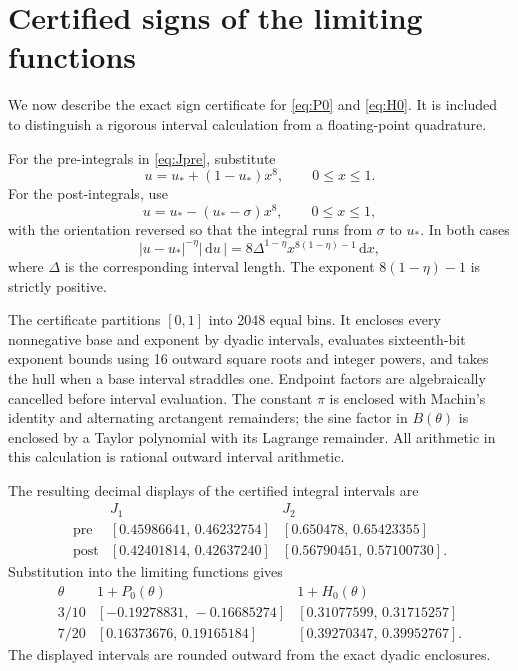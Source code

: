 \documentclass[11pt]{article}
\theoremstyle{definition}
\theoremstyle{remark}
\newcommand{\dd}{\mathrm d}
\begin{document}
\section{Certified signs of the limiting functions}\label{sec:certificate}

We now describe the exact sign certificate for \eqref{eq:P0} and
\eqref{eq:H0}.  It is included to distinguish a rigorous interval
calculation from a floating-point quadrature.

For the pre-integrals in \eqref{eq:Jpre}, substitute
\[
  u=u_*+(1-u_*)x^8,\qquad 0\leq x\leq1.
\]
For the post-integrals, use
\[
  u=u_*-(u_*-\sigma)x^8,\qquad 0\leq x\leq1,
\]
with the orientation reversed so that the integral runs from \(\sigma\) to
\(u_*\).  In both cases
\[
  |u-u_*|^{-\eta}|\,\dd u\,|
  =8\Delta^{1-\eta}x^{8(1-\eta)-1}\,\dd x,
\]
where \(\Delta\) is the corresponding interval length.  The exponent
\(8(1-\eta)-1\) is strictly positive.

The certificate partitions \([0,1]\) into 2048 equal bins.  It encloses
every nonnegative base and exponent by dyadic intervals, evaluates
sixteenth-bit exponent bounds using 16 outward square roots and integer
powers, and takes the hull when a base interval straddles one.  Endpoint
factors are algebraically cancelled before interval evaluation.  The
constant \(\pi\) is enclosed with Machin's identity and alternating
arctangent remainders; the sine factor in \(B(\theta)\) is enclosed by a
Taylor polynomial with its Lagrange remainder.  All arithmetic in this
calculation is rational outward interval arithmetic.

The resulting decimal displays of the certified integral intervals are
\[
\begin{array}{c|cc}
 &J_1&J_2\\ \hline
\mathrm{pre}
 &[0.45986641,\,0.46232754]&[0.650478,\,0.65423355]\\
\mathrm{post}
 &[0.42401814,\,0.42637240]&[0.56790451,\,0.57100730].
\end{array}
\]
Substitution into the limiting functions gives
\[
\begin{array}{c|cc}
\theta&1+P_0(\theta)&1+H_0(\theta)\\ \hline
3/10
 &[-0.19278831,\,-0.16685274]
 &[0.31077599,\,0.31715257]\\
7/20
 &[0.16373676,\,0.19165184]
 &[0.39270347,\,0.39952767].
\end{array}
\]
The displayed intervals are rounded outward from the exact dyadic
enclosures.
\end{document}
